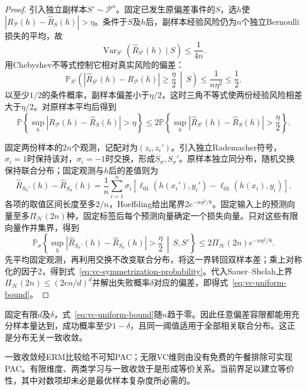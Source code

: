 \begin{proof}
引入独立副样本$S'\sim\mathcal P^n$。固定已发生原偏差事件的$S$，选$h$使$|R_{\mathcal P}(h)-\hat R_S(h)|>\eta$。条件于$S$及$h$后，副样本经验风险仍为$n$个独立Bernoulli损失的平均，故
\[
 \operatorname{Var}_{S'}\!\left(\hat R_{S'}(h)\mid S\right)
 \leq\frac{1}{4n}.
\]
用Chebyshev不等式控制它相对真实风险的偏差：
\[
 \mathbb P_{S'}\left(
   |\hat R_{S'}(h)-R_{\mathcal P}(h)|\geq\frac{\eta}{2}
   \,\middle|\,S
 \right)
 \leq\frac{1}{n\eta^2}\leq\frac12.
\]
以至少$1/2$的条件概率，副样本偏差小于$\eta/2$，这时三角不等式使两份经验风险相差大于$\eta/2$。对原样本平均后得到
\[
 \mathbb P\left\{\sup_h|R_{\mathcal P}(h)-\hat R_S(h)|>\eta\right\}
 \leq
 2\mathbb P\left\{\sup_h|\hat R_{S'}(h)-\hat R_S(h)|>\frac\eta2\right\}.
\]


固定两份样本的$2n$个观测，记配对为$(z_i,z_i')$。引入独立Rademacher符号，$\sigma_i=1$时保持该对，$\sigma_i=-1$时交换，形成$S_\sigma,S_\sigma'$。原样本独立同分布，随机交换保持联合分布；固定观测与$h$后的差值则为
\[
 \hat R_{S_\sigma'}(h)-\hat R_{S_\sigma}(h)
 =\frac1n\sum_{i=1}^n\sigma_i
 \left[\ell_{01}(h(x_i'),y_i')-\ell_{01}(h(x_i),y_i)\right].
\]
各项的取值区间长度至多$2/n$，Hoeffding给出尾界$2e^{-n\eta^2/8}$。固定输入上的预测向量至多$\Pi_{\mathcal H}(2n)$种，固定标签后每个预测向量确定一个损失向量。只对这些有限向量作并集界，得到
\[
 \mathbb P_\sigma\left\{
   \sup_h|\hat R_{S_\sigma'}(h)-\hat R_{S_\sigma}(h)|>\frac\eta2
   \,\middle|\,S,S'
 \right\}
 \leq2\Pi_{\mathcal H}(2n)e^{-n\eta^2/8}.
\]
先平均固定观测，再利用交换不改变联合分布，将这一界转回双样本差；乘上对称化的因子2，得到式~\eqref{eq:vc-symmetrization-probability}。代入Sauer--Shelah上界$\Pi_{\mathcal H}(2n)\leq(2en/d)^d$并解出失败概率$\delta$对应的偏差，即得式~\eqref{eq:vc-uniform-bound}。
\end{proof}

固定有限$d$及$\delta$，式~\eqref{eq:vc-uniform-bound}随$n$趋于零。因此任意偏差容限都能用充分样本量达到，成功概率至少$1-\delta$，且同一阈值适用于全部相关联合分布。这正是分布无关一致收敛。

一致收敛经ERM比较给不可知PAC；无限VC维则由没有免费的午餐排除可实现PAC。有限维度、两类学习与一致收敛于是形成等价关系。当前界足以建立等价性，其中对数项却未必是最优样本复杂度所必需的。

